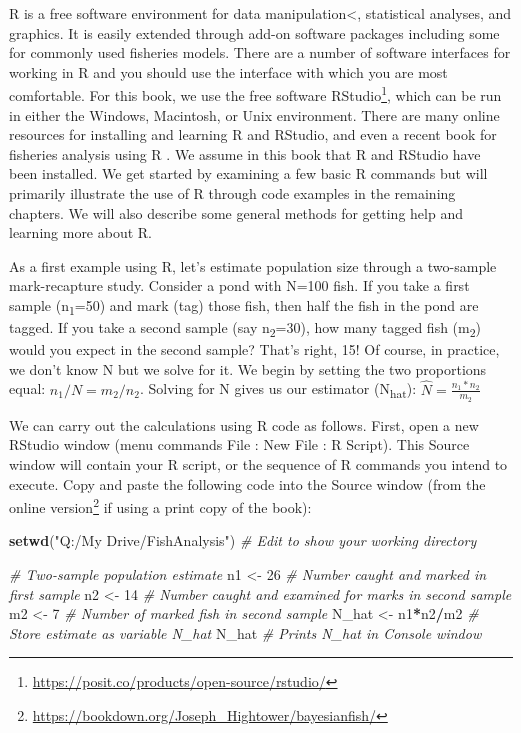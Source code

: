 \documentclass[
]{krantz}
\makeatletter
\newenvironment{Shaded}{\begin{snugshade}}{\end{snugshade}}
\newcommand{\CommentTok}[1]{\textcolor[rgb]{0.37,0.37,0.37}{\textit{#1}}}
\newcommand{\DecValTok}[1]{\textcolor[rgb]{0.06,0.06,0.06}{#1}}
\newcommand{\FunctionTok}[1]{\textcolor[rgb]{0.27,0.27,0.27}{\textbf{#1}}}
\newcommand{\NormalTok}[1]{#1}
\newcommand{\OtherTok}[1]{\textcolor[rgb]{0.37,0.37,0.37}{#1}}
\newcommand{\SpecialCharTok}[1]{\textcolor[rgb]{0.43,0.43,0.43}{\textbf{#1}}}
\newcommand{\StringTok}[1]{\textcolor[rgb]{0.5,0.5,0.5}{#1}}
\renewcommand{\href}[2]{#2\footnote{\url{#1}}}
\newenvironment{kframe}{%
\medskip{}
\setlength{\fboxsep}{.8em}
 \def\at@end@of@kframe{}%
 \ifinner\ifhmode%
  \def\at@end@of@kframe{\end{minipage}}%
  \begin{minipage}{\columnwidth}%
 \fi\fi%
 \def\FrameCommand##1{\hskip\@totalleftmargin \hskip-\fboxsep
 \colorbox{shadecolor}{##1}\hskip-\fboxsep
     \hskip-\linewidth \hskip-\@totalleftmargin \hskip\columnwidth}%
 \MakeFramed {\advance\hsize-\width
   \@totalleftmargin\z@ \linewidth\hsize
   \@setminipage}}%
 {\par\unskip\endMakeFramed%
 \at@end@of@kframe}
\renewenvironment{Shaded}{\begin{kframe}}{\end{kframe}}
\makeatother
\begin{document}
R \citep{R-base} is a free software environment for data manipulation\textless, statistical analyses, and graphics. It is easily extended through add-on software packages including some for commonly used fisheries models. There are a number of software interfaces for working in R and you should use the interface with which you are most comfortable. For this book, we use the free software \href{https://posit.co/products/open-source/rstudio/}{RStudio}, which can be run in either the Windows, Macintosh, or Unix environment. There are many online resources for installing and learning R and RStudio, and even a recent book for fisheries analysis using R \citep{ogle_2018}. We assume in this book that R and RStudio have been installed. We get started by examining a few basic R commands but will primarily illustrate the use of R through code examples in the remaining chapters. We will also describe some general methods for getting help and learning more about R.

As a first example using R, let's estimate population size through a two-sample mark-recapture study. Consider a pond with N=100 fish. If you take a first sample (n\textsubscript{1}=50) and mark (tag) those fish, then half the fish in the pond are tagged. If you take a second sample (say n\textsubscript{2}=30), how many tagged fish (m\textsubscript{2}) would you expect in the second sample? That's right, 15! Of course, in practice, we don't know N but we solve for it. We begin by setting the two proportions equal: \(n_1/N=m_2/n_2\). Solving for N gives us our estimator (N\textsubscript{hat}): \(\hat{N} = \frac{n_1*n_2}{m_2}\)

We can carry out the calculations using R code as follows. First, open a new RStudio window (menu commands File : New File : R Script). This Source window will contain your R script, or the sequence of R commands you intend to execute. Copy and paste the following code into the Source window (from the online \href{https://bookdown.org/Joseph_Hightower/bayesianfish/}{version} if using a print copy of the book):

\begin{Shaded}
\begin{Highlighting}[]
\FunctionTok{setwd}\NormalTok{(}\StringTok{"Q:/My Drive/FishAnalysis"}\NormalTok{) }\CommentTok{\# Edit to show your working directory}

\CommentTok{\# Two{-}sample population estimate}
\NormalTok{n1 }\OtherTok{\textless{}{-}} \DecValTok{26} \CommentTok{\# Number caught and marked in first sample}
\NormalTok{n2 }\OtherTok{\textless{}{-}} \DecValTok{14} \CommentTok{\# Number caught and examined for marks in second sample}
\NormalTok{m2 }\OtherTok{\textless{}{-}} \DecValTok{7} \CommentTok{\# Number of marked fish in second sample}
\NormalTok{N\_hat }\OtherTok{\textless{}{-}}\NormalTok{ n1}\SpecialCharTok{*}\NormalTok{n2}\SpecialCharTok{/}\NormalTok{m2 }\CommentTok{\# Store estimate as variable N\_hat}
\NormalTok{N\_hat }\CommentTok{\# Prints N\_hat in Console window}
\end{Highlighting}
\end{Shaded}
\end{document}
